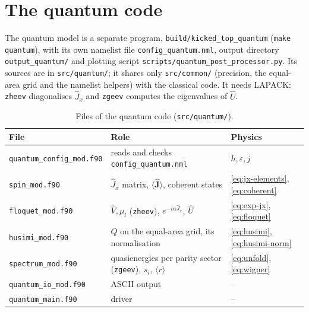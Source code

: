 \documentclass[11pt,a4paper]{article}
\newcommand{\vJ}{\bm{J}}
\begin{document}

\section{The quantum code}\label{sec:qcode}

The quantum model is a separate program, \texttt{build/kicked\_top\_quantum} (\texttt{make quantum}), with its own
namelist file \texttt{config\_quantum.nml}, output directory \texttt{output\_quantum/} and plotting script
\texttt{scripts/quantum\_post\_processor.py}. Its sources are in \texttt{src/quantum/}; it shares only
\texttt{src/common/} (precision, the equal-area grid and the namelist helpers) with the classical code. It needs
LAPACK: \texttt{zheev} diagonalises $\hat J_x$ and \texttt{zgeev} computes the eigenvalues of $\hat U$.

\begin{table}[h]
\centering\small
\begin{tabular}{lll}
\toprule
File & Role & Physics \\
\midrule
\texttt{quantum\_config\_mod.f90} & reads and checks \texttt{config\_quantum.nml} & $h, \varepsilon, j$ \\
\texttt{spin\_mod.f90} & $\hat J_x$ matrix, $\langle\hat{\vJ}\rangle$, coherent states & \eqref{eq:jx-elements}, \eqref{eq:coherent} \\
\texttt{floquet\_mod.f90} & $\hat V, \mu_l$ (\texttt{zheev}), $e^{-i\alpha\hat J_x}$, $\hat U$ & \eqref{eq:exp-jx}, \eqref{eq:floquet} \\
\texttt{husimi\_mod.f90} & $Q$ on the equal-area grid, its normalisation & \eqref{eq:husimi}, \eqref{eq:husimi-norm} \\
\texttt{spectrum\_mod.f90} & quasienergies per parity sector (\texttt{zgeev}), $s_i$, $\langle r\rangle$ & \eqref{eq:unfold}, \eqref{eq:wigner} \\
\texttt{quantum\_io\_mod.f90} & ASCII output & -- \\
\texttt{quantum\_main.f90} & driver & -- \\
\bottomrule
\end{tabular}
\caption{Files of the quantum code (\texttt{src/quantum/}).}
\label{tab:qmodules}
\end{table}
\end{document}
